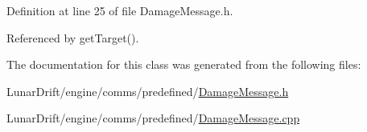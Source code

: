Definition at line 25 of file Damage\+Message.\+h.



Referenced by get\+Target().



The documentation for this class was generated from the following files\+:\begin{DoxyCompactItemize}
\item 
Lunar\+Drift/engine/comms/predefined/\hyperlink{_damage_message_8h}{Damage\+Message.\+h}\item 
Lunar\+Drift/engine/comms/predefined/\hyperlink{_damage_message_8cpp}{Damage\+Message.\+cpp}\end{DoxyCompactItemize}
